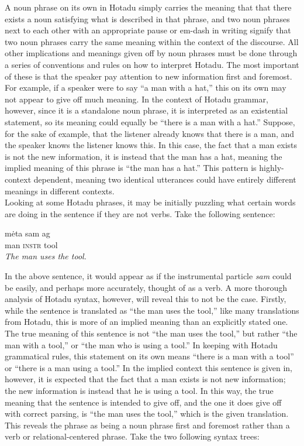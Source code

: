 \documentclass{article}[10pt]
\begin{document}
A noun phrase on its own in Hotadu simply carries the meaning that that there exists a noun satisfying what is described in that phrase, and two noun phrases next to each other with an appropriate pause or em-dash in writing signify that two noun phrases carry the same meaning within the context of the discourse. All other implications and meanings given off by noun phrases must be done through a series of conventions and rules on how to interpret Hotadu. The most important of these is that the speaker pay attention to new information first and foremost. For example, if a speaker were to say ``a man with a hat,'' this on its own may not appear to give off much meaning. In the context of Hotadu grammar, however, since it is a standalone noun phrase, it is interpreted as an existential statement, so its meaning could equally be ``there is a man with a hat.'' Suppose, for the sake of example, that the listener already knows that there is a man, and the speaker knows the listener knows this. In this case, the fact that a man exists is not the new information, it is instead that the man has a hat, meaning the implied meaning of this phrase is ``the man has a hat.'' This pattern is highly-context dependent, meaning two identical utterances could have entirely different meanings in different contexts.\\

Looking at some Hotadu phrases, it may be initially puzzling what certain words are doing in the sentence if they are not verbs. Take the following sentence:
\begin{exe}
\ex
\gll m\.{e}ta sam ag\\
man \textsc{instr} tool\\
\trans \emph{The man uses the tool.}
\end{exe}

In the above sentence, it would appear as if the instrumental particle \emph{sam} could be easily, and perhaps more accurately, thought of as a verb. A more thorough analysis of Hotadu syntax, however, will reveal this to not be the case. Firstly, while the sentence is translated as ``the man uses the tool,'' like many translations from Hotadu, this is more of an implied meaning than an explicitly stated one. The true meaning of this sentence is not ``the man uses the tool,'' but rather ``the man with a tool,'' or ``the man who is using a tool.'' In keeping with Hotadu grammatical rules, this statement on its own means ``there is a man with a tool'' or ``there is a man using a tool.'' In the implied context this sentence is given in, however, it is expected that the fact that a man exists is not new information; the new information is instead that he is using a tool. In this way, the true meaning that the sentence is intended to give off, and the one it does give off with correct parsing, is ``the man uses the tool,'' which is the given translation. This reveals the phrase as being a noun phrase first and foremost rather than a verb or relational-centered phrase. Take the two following syntax trees:
\end{document}

